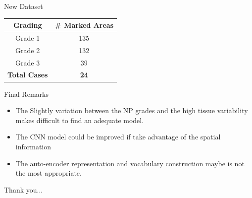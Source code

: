 \documentclass[usenames,dvipsnames]{beamer}
\begin{document}
\begin{frame}{New Dataset}
    \begin{table}[]
\begin{tabular}{|c|c|}
\hline
Grading              & \# Marked Areas \\ \hline
Grade 1              & 135             \\ \hline
Grade 2              & 132             \\ \hline
Grade 3              & 39              \\ \hline\hline
\textbf{Total Cases} & \textbf{24}     \\ \hline
\end{tabular}
\end{table}
\end{frame}



\begin{frame}{Final Remarks}

\begin{itemize}
    \item The Slightly variation between the NP grades and the high tissue variability makes difficult to find an adequate model.
    \item The CNN model could be improved if take advantage of the spatial information
    \item The auto-encoder representation and vocabulary construction maybe is not the most appropriate.
\end{itemize}
    
\end{frame}








\begin{frame}
    Thank you...
\end{frame}
\end{document}
